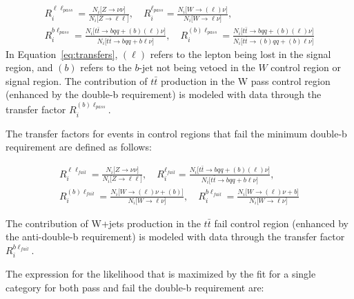 \begin{gather}
  R_i^{\ell\ell_{pass}} = \frac{N_i\big[Z\rightarrow\nu\nu\big]}{N_i\big[Z\rightarrow\ell\ell\big]}, \quad 
  R_i^{\ell_{pass}} = \frac{N_i\big[W\rightarrow(\ell)\nu\big]}{N_i\big[W\rightarrow\ell\nu\big]}, \quad \nonumber \\
  R_i^{b\ell_{pass}} = \frac{N_i\big[t\bar{t}\rightarrow bqq+(b)(\ell)\nu\big]}{N_i\big[t\bar{t}\rightarrow bqq+b\ell\nu\big]}, \quad 
  R_i^{(b)\ell_{pass}} = \frac{N_i\big[t\bar{t}\rightarrow bqq+(b)(\ell)\nu\big]}{N_i\big[t\bar{t}\rightarrow (b)qq+(b)\ell\nu\big]}
\label{eq:transfers}
\end{gather}
In Equation~\ref{eq:transfers}, $(\ell)$ refers to the lepton being lost in the signal region, and $(b)$ refers to the $b$-jet not being vetoed in the $W$ control region or signal region. The contribution of $t\bar{t}$ production in the W pass control region (enhanced by the double-b requirement) is modeled with data through the transfer factor $R_i^{(b)\ell_{pass}}$.

The transfer factors for events in control regions that fail the minimum double-b requirement are defined as follows:

\begin{gather}
  R_i^{\ell\ell_{fail}} = \frac{N_i\big[Z\rightarrow\nu\nu\big]}{N_i\big[Z\rightarrow\ell\ell\big]}, \quad
  R_i^{\ell_{fail}} = \frac{N_i\big[t\bar{t}\rightarrow bqq+(b)(\ell)\nu\big]}{N_i\big[t\bar{t}\rightarrow bqq+b\ell\nu\big]}, \quad \nonumber \\
  R_i^{(b)\ell_{fail}} = \frac{N_i\big[W\rightarrow(\ell)\nu+(b)\big]}{N_i\big[W\rightarrow\ell\nu\big]}, \quad
  R_i^{b\ell_{fail}} = \frac{N_i\big[W\rightarrow(\ell)\nu+b\big]}{N_i\big[W\rightarrow\ell\nu\big]}
\label{eq:transfers}
\end{gather}

The contribution of W+jets production in the $t\bar{t}$ fail control region (enhanced by the anti-double-b requirement) is modeled with data through the transfer factor $R_i^{b\ell_{fail}}$.


The expression for the likelihood that is maximized by the fit for a single category for both pass and fail the double-b requirement are:

